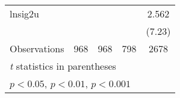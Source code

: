 {\begin{longtable}{l*{4}{c}}
lnsig2u         &                  &                  &                  &    2.562\sym{***}\\
                &                  &                  &                  &   (7.23)         \\
\hline
Observations    &      968         &      968         &      798         &     2678         \\
\hline\hline
\multicolumn{5}{l}{\footnotesize \textit{t} statistics in parentheses}\\
\multicolumn{5}{l}{\footnotesize \sym{*} \(p<0.05\), \sym{**} \(p<0.01\), \sym{***} \(p<0.001\)}\\
\end{longtable}
}
